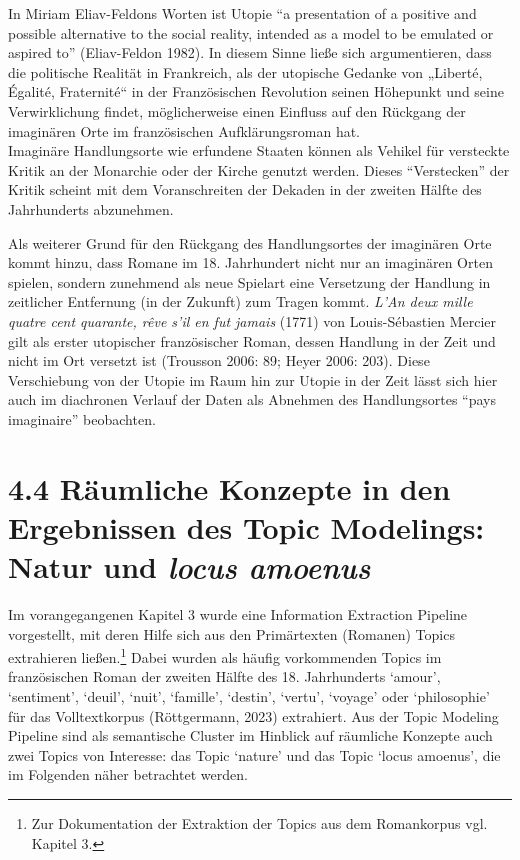 \documentclass[
  12pt,
  letterpaper,
  DIV=11,
  numbers=noendperiod]{scrreprt}
\begin{document}
In Miriam Eliav-Feldons Worten ist Utopie ``a presentation of a positive
and possible alternative to the social reality, intended as a model to
be emulated or aspired to'' (Eliav-Feldon 1982). In diesem Sinne ließe
sich argumentieren, dass die politische Realität in Frankreich, als der
utopische Gedanke von „Liberté, Égalité, Fraternité`` in der
Französischen Revolution seinen Höhepunkt und seine Verwirklichung
findet, möglicherweise einen Einfluss auf den Rückgang der imaginären
Orte im französischen Aufklärungsroman hat.\\
Imaginäre Handlungsorte wie erfundene Staaten können als Vehikel für
versteckte Kritik an der Monarchie oder der Kirche genutzt werden.
Dieses ``Verstecken'' der Kritik scheint mit dem Voranschreiten der
Dekaden in der zweiten Hälfte des Jahrhunderts abzunehmen.

Als weiterer Grund für den Rückgang des Handlungsortes der imaginären
Orte kommt hinzu, dass Romane im 18. Jahrhundert nicht nur an imaginären
Orten spielen, sondern zunehmend als neue Spielart eine Versetzung der
Handlung in zeitlicher Entfernung (in der Zukunft) zum Tragen kommt.
\emph{L'An deux mille quatre cent quarante, rêve s'il en fut jamais}
(1771) von Louis-Sébastien Mercier gilt als erster utopischer
französischer Roman, dessen Handlung in der Zeit und nicht im Ort
versetzt ist (Trousson 2006: 89; Heyer 2006: 203). Diese Verschiebung
von der Utopie im Raum hin zur Utopie in der Zeit lässt sich hier auch
im diachronen Verlauf der Daten als Abnehmen des Handlungsortes ``pays
imaginaire'' beobachten.

\section{\texorpdfstring{4.4 Räumliche Konzepte in den Ergebnissen des
Topic Modelings: Natur und \emph{locus
amoenus}}{4.4 Räumliche Konzepte in den Ergebnissen des Topic Modelings: Natur und locus amoenus}}\label{ruxe4umliche-konzepte-in-den-ergebnissen-des-topic-modelings-natur-und-locus-amoenus}

Im vorangegangenen Kapitel 3 wurde eine Information Extraction Pipeline
vorgestellt, mit deren Hilfe sich aus den Primärtexten (Romanen) Topics
extrahieren ließen.\footnote{Zur Dokumentation der Extraktion der Topics
  aus dem Romankorpus vgl. Kapitel 3.} Dabei wurden als häufig
vorkommenden Topics im französischen Roman der zweiten Hälfte des 18.
Jahrhunderts `amour', `sentiment', `deuil', `nuit', `famille', `destin',
`vertu', `voyage' oder `philosophie' für das Volltextkorpus
(Röttgermann, 2023) extrahiert. Aus der Topic Modeling Pipeline sind als
semantische Cluster im Hinblick auf räumliche Konzepte auch zwei Topics
von Interesse: das Topic `nature' und das Topic `locus amoenus', die im
Folgenden näher betrachtet werden.
\end{document}
